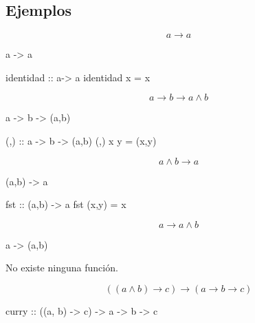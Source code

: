 \documentclass[aspectratio=169]{beamer}
\begin{document}
\subsection{Ejemplos}
\begin{frame}[fragile]  
  $$a \rightarrow a$$
\pause
\begin{sesion}
a -> a
\end{sesion}
\pause
\begin{code}
identidad :: a-> a
identidad x = x
\end{code}  

\end{frame}

\begin{frame}[fragile]
  $$a \rightarrow b \rightarrow a\wedge b $$
\pause

\begin{sesion}
a -> b -> (a,b)
\end{sesion}
\pause

\begin{code}
(,) :: a -> b -> (a,b)
(,) x y = (x,y)
\end{code}

\end{frame}

\begin{frame}[fragile]
  $$a \wedge b \rightarrow a $$
\pause

\begin{sesion}  
(a,b) -> a
\end{sesion}

\pause

\begin{code}
fst :: (a,b) -> a
fst (x,y) = x
\end{code}

\end{frame}

\begin{frame}[fragile]
  $$a \rightarrow a\wedge b $$

\pause
\begin{sesion}
a -> (a,b)
\end{sesion}
  
\pause
No existe ninguna función.
\end{frame}

\begin{frame}[fragile]
  $$((a\wedge b) \rightarrow c) \rightarrow (a \rightarrow b \rightarrow c) $$

  \pause
  
\begin{code}
curry :: ((a, b) -> c) -> a -> b -> c  
\end{code}
\end{frame}
\end{document}
